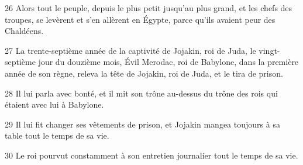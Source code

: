 \par 26 Alors tout le peuple, depuis le plus petit jusqu'au plus grand, et les chefs des troupes, se levèrent et s'en allèrent en Égypte, parce qu'ils avaient peur des Chaldéens.
\par 27 La trente-septième année de la captivité de Jojakin, roi de Juda, le vingt-septième jour du douzième mois, Évil Merodac, roi de Babylone, dans la première année de son règne, releva la tête de Jojakin, roi de Juda, et le tira de prison.
\par 28 Il lui parla avec bonté, et il mit son trône au-dessus du trône des rois qui étaient avec lui à Babylone.
\par 29 Il lui fit changer ses vêtements de prison, et Jojakin mangea toujours à sa table tout le temps de sa vie.
\par 30 Le roi pourvut constamment à son entretien journalier tout le temps de sa vie.


